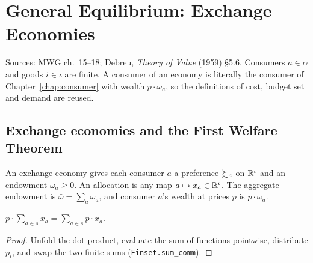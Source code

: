 \chapter{General Equilibrium: Exchange Economies}
\label{chap:ge}

Sources: MWG ch.~15--18; Debreu, \emph{Theory of Value} (1959) \S5.6. Consumers $a \in \alpha$ and goods
$i \in \iota$ are finite. A consumer of an economy is literally the consumer of Chapter~\ref{chap:consumer} with
wealth $p \cdot \omega_a$, so the definitions of cost, budget set and demand are reused.

\section{Exchange economies and the First Welfare Theorem}
\label{sec:exchange}

\begin{definition}
\label{def:exchange_economy}
\leanok
{}
An exchange economy gives each consumer $a$ a preference $\succsim_a$ on $\mathbb{R}^\iota$ and an endowment $\omega_a \ge 0$.
An allocation is any map $a \mapsto x_a \in \mathbb{R}^\iota$. The aggregate endowment is $\bar\omega = \sum_a \omega_a$, and
consumer $a$'s wealth at prices $p$ is $p \cdot \omega_a$.
\end{definition}

\begin{lemma}
\label{lem:cost_sum}
\leanok
{}
$p \cdot \sum_{a \in s} x_a = \sum_{a \in s} p \cdot x_a$.
\end{lemma}
\begin{proof}
\leanok
Unfold the dot product, evaluate the sum of functions pointwise, distribute $p_i$, and swap the two finite sums
(\texttt{Finset.sum\_comm}).
\end{proof}

